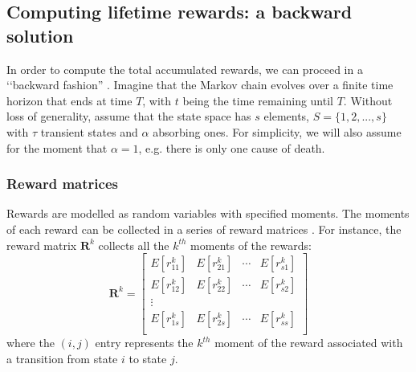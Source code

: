 \documentclass[\main/main.tex]{subfiles}
\begin{document}
\subsection{Computing lifetime rewards: a backward solution}\label{sec:backward_solution}
In order to compute the total accumulated rewards, we can proceed in a \lq\lq backward fashion'' \citep{Caswell2011, Howard1960}. Imagine that the Markov chain evolves over a finite time horizon that ends at time $T$, with $t$ being the time remaining until $T$. Without loss of generality, assume that the state space has $s$ elements, $S=\{1,2,...,s\}$ with $\tau$ transient states and $\alpha$ absorbing ones. For simplicity, we will also assume for the moment that $\alpha =1$, e.g. there is only one cause of death.\\

\subsubsection{Reward matrices}
Rewards are modelled as random variables with specified moments. The moments of each reward can be collected in a series of reward matrices \citep{Caswell2018}. For instance, the reward matrix $\mathbf{R}^k$ collects all the $k^{th}$ moments of the rewards:
\begin{equation}
 \bm{R}^{k} = 
 \begin{bmatrix}
  E[r^k_{11}]  &  E[r^k_{21}]  & \cdots &  E[r^k_{s1}] \\
E[r^k_{12}]  &  E[r^k_{22}]  & \cdots &  E[r^k_{s2}] \\
\vdots & & &\\
  E[r^k_{1s}]  &  E[r^k_{2s}]  & \cdots &  E[r^k_{ss}] \\
 \end{bmatrix}
\end{equation}
where the $(i,j)$ entry represents the $k^{th}$ moment of the reward associated with a transition from state $i$ to state $j$.\\
\end{document}
